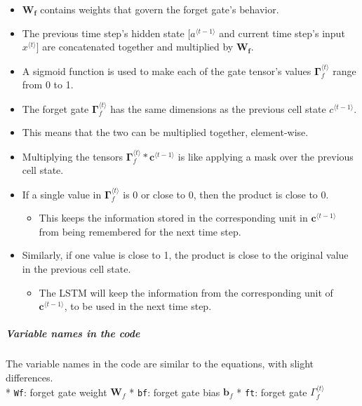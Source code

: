 \documentclass[11pt]{article}
\providecommand{\tightlist}{%
      \setlength{\itemsep}{0pt}\setlength{\parskip}{0pt}}
\begin{document}
\begin{itemize}
\tightlist
\item
  \(\mathbf{W_{f}}\) contains weights that govern the forget gate's
  behavior.
\item
  The previous time step's hidden state \([a^{\langle t-1 \rangle}\) and
  current time step's input \(x^{\langle t \rangle}]\) are concatenated
  together and multiplied by \(\mathbf{W_{f}}\).
\item
  A sigmoid function is used to make each of the gate tensor's values
  \(\mathbf{\Gamma}_f^{\langle t \rangle}\) range from 0 to 1.
\item
  The forget gate \(\mathbf{\Gamma}_f^{\langle t \rangle}\) has the same
  dimensions as the previous cell state \(c^{\langle t-1 \rangle}\).
\item
  This means that the two can be multiplied together, element-wise.
\item
  Multiplying the tensors
  \(\mathbf{\Gamma}_f^{\langle t \rangle} * \mathbf{c}^{\langle t-1 \rangle}\)
  is like applying a mask over the previous cell state.
\item
  If a single value in \(\mathbf{\Gamma}_f^{\langle t \rangle}\) is 0 or
  close to 0, then the product is close to 0.

  \begin{itemize}
  \tightlist
  \item
    This keeps the information stored in the corresponding unit in
    \(\mathbf{c}^{\langle t-1 \rangle}\) from being remembered for the
    next time step.
  \end{itemize}
\item
  Similarly, if one value is close to 1, the product is close to the
  original value in the previous cell state.

  \begin{itemize}
  \tightlist
  \item
    The LSTM will keep the information from the corresponding unit of
    \(\mathbf{c}^{\langle t-1 \rangle}\), to be used in the next time
    step.
  \end{itemize}
\end{itemize}

\hypertarget{variable-names-in-the-code}{%
\subparagraph{Variable names in the
code}\label{variable-names-in-the-code}}

The variable names in the code are similar to the equations, with slight
differences.\\
* \texttt{Wf}: forget gate weight \(\mathbf{W}_{f}\) * \texttt{bf}:
forget gate bias \(\mathbf{b}_{f}\) * \texttt{ft}: forget gate
\(\Gamma_f^{\langle t \rangle}\)
\end{document}
